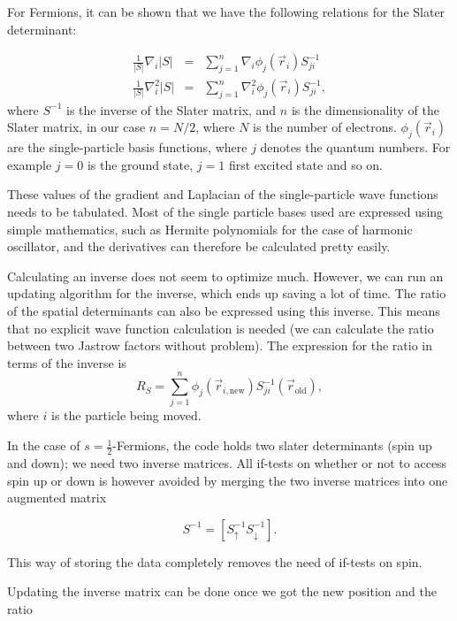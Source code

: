For Fermions, it can be shown that we have the following relations for the Slater determinant\cite{larseivind}:

\begin{eqnarray}
 \frac{1}{|S|}\nabla_i |S| &=& \displaystyle\sum_{j=1}^n \nabla_i \phi_j(\vec r_i)S^{-1}_{ji} \\ 
\frac{1}{|S|}\nabla^2_i |S| &=& \displaystyle\sum_{j=1}^n \nabla^2_i \phi_j(\vec r_i)S^{-1}_{ji},\nonumber
\label{eq:grad_lapl_S}
\end{eqnarray}
where $S^{-1}$ is the inverse of the Slater matrix, and $n$ is the dimensionality of the Slater matrix, in our case $n=N/2$, where $N$ is the number of electrons. $\phi_j(\vec r_i)$ are the single-particle basis functions, where $j$ denotes the quantum numbers. For example $j=0$ is the ground state, $j=1$ first excited state and so on. 

These values of the gradient and Laplacian of the single-particle wave functions needs to be tabulated. Most of the single particle bases used are expressed using simple mathematics, such as Hermite polynomials for the case of harmonic oscillator, and the derivatives can therefore be calculated pretty easily. 

Calculating an inverse does not seem to optimize much. However, we can run an updating algorithm for the inverse, which ends up saving a lot of time. The ratio of the spatial determinants can also be expressed using this inverse\cite{larseivind}. This means that no explicit wave function calculation is needed (we can calculate the ratio between two Jastrow factors without problem). The expression for the ratio in terms of the inverse is
\begin{equation}
 R_S = \displaystyle\sum_{j=1}^n \phi_j({\vec r}_{i,\mathrm{new}})S^{-1}_{ji}(\vec r_\mathrm{old}),
\label{eq:Ratio}
\end{equation}
where $i$ is the particle being moved.

In the case of $s=\frac{1}{2}$-Fermions, the code holds two slater determinants (spin up and down); we need two inverse matrices. All if-tests on whether or not to access spin up or down is however avoided by merging the two inverse matrices into one augmented matrix

\[
 S^{-1} = \left[S^{-1}_\uparrow S^{-1}_\downarrow\right].
\]

\noindent
This way of storing the data completely removes the need of if-tests on spin.

Updating the inverse matrix can be done once we got the new position and the ratio

